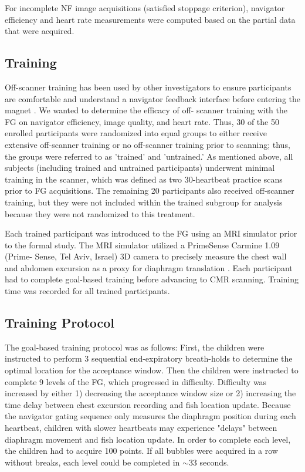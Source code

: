 	For incomplete NF image acquisitions (satisfied stoppage criterion), navigator efficiency and heart rate measurements were computed based on the partial data that were acquired.

\subsection{Training}
	Off-scanner training has been used by other investigators to ensure participants are comfortable and understand a navigator feedback interface before entering the magnet \cite{Feuerlein2009}. We wanted to determine the efficacy of off- scanner training with the FG on navigator efficiency, image quality, and heart rate. Thus, 30 of the 50 enrolled participants were randomized into equal groups to either receive extensive off-scanner training or no off-scanner training prior to scanning; thus, the groups were referred to as 'trained' and 'untrained.' As mentioned above, all subjects (including trained and untrained participants) underwent minimal training in the scanner, which was defined as two 30-heartbeat practice scans prior to FG acquisitions. The remaining 20 participants also received off-scanner training, but they were not included within the trained subgroup for analysis because they were not randomized to this treatment.
	
	Each trained participant was introduced to the FG using	an MRI simulator prior to the formal study. The MRI simulator utilized a PrimeSense Carmine 1.09 (Prime- Sense, Tel Aviv, Israel) 3D camera to precisely measure the chest wall and abdomen excursion as a proxy for diaphragm translation \cite{Harte2016,Heß2015}. Each participant had to complete goal-based training before advancing to CMR scanning. Training time was recorded for all trained participants.
	
\subsection{Training Protocol}
	The goal-based training protocol was as follows: First, the children were instructed to perform 3 sequential end-expiratory breath-holds to determine the optimal location for the acceptance window. Then the children were instructed to complete 9 levels of the FG, which progressed in difficulty. Difficulty was increased by either 1) decreasing the acceptance window size or 2) increasing the time delay between chest excursion recording and fish location update. Because the navigator gating sequence only measures the diaphragm position during each heartbeat, children with slower heartbeats may experience "delays" between diaphragm movement and fish location update. In order to complete each level, the children had to acquire 100 points. If all bubbles were acquired in a row without breaks, each level could be completed in $\sim$33 seconds.


